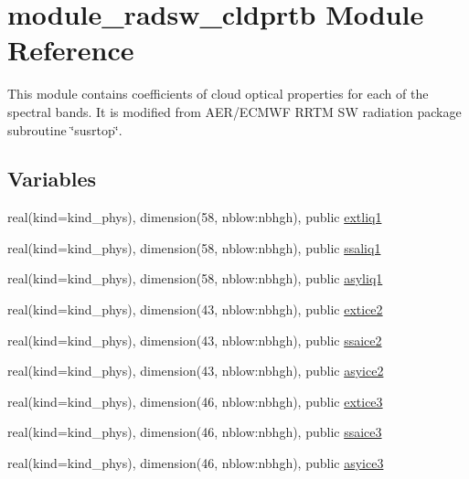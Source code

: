\hypertarget{namespacemodule__radsw__cldprtb}{}\section{module\+\_\+radsw\+\_\+cldprtb Module Reference}
\label{namespacemodule__radsw__cldprtb}


This module contains coefficients of cloud optical properties for each of the spectral bands. It is modified from A\+E\+R/\+E\+C\+M\+WF R\+R\+TM SW radiation package subroutine \char`\"{}susrtop\char`\"{}.  


\subsection*{Variables}
\begin{DoxyCompactItemize}
\item 
real(kind=kind\+\_\+phys), dimension(58, nblow\+:nbhgh), public \hyperlink{namespacemodule__radsw__cldprtb_ac68593a33577c720ca8c74eafb3c9f96}{extliq1}
\item 
real(kind=kind\+\_\+phys), dimension(58, nblow\+:nbhgh), public \hyperlink{namespacemodule__radsw__cldprtb_a7944084ba9f240723dc93467ec66f825}{ssaliq1}
\item 
real(kind=kind\+\_\+phys), dimension(58, nblow\+:nbhgh), public \hyperlink{namespacemodule__radsw__cldprtb_a430be0720aa2e2ac46aa1ec7c9a9b64b}{asyliq1}
\item 
real(kind=kind\+\_\+phys), dimension(43, nblow\+:nbhgh), public \hyperlink{namespacemodule__radsw__cldprtb_a8ed403302034ea073243157749673e14}{extice2}
\item 
real(kind=kind\+\_\+phys), dimension(43, nblow\+:nbhgh), public \hyperlink{namespacemodule__radsw__cldprtb_a48555ff54d3a46f8c49733ff82e94d70}{ssaice2}
\item 
real(kind=kind\+\_\+phys), dimension(43, nblow\+:nbhgh), public \hyperlink{namespacemodule__radsw__cldprtb_ad9328ffc5e90cc62c8c9c5089b55fc79}{asyice2}
\item 
real(kind=kind\+\_\+phys), dimension(46, nblow\+:nbhgh), public \hyperlink{namespacemodule__radsw__cldprtb_a8b8bae831aa5b460e260c94e7f24f4c7}{extice3}
\item 
real(kind=kind\+\_\+phys), dimension(46, nblow\+:nbhgh), public \hyperlink{namespacemodule__radsw__cldprtb_a39b045b05e6bc9c04603277654ff8fc6}{ssaice3}
\item 
real(kind=kind\+\_\+phys), dimension(46, nblow\+:nbhgh), public \hyperlink{namespacemodule__radsw__cldprtb_aec2685be0de3a557aca169062cf1055e}{asyice3}

\end{DoxyCompactItemize}
